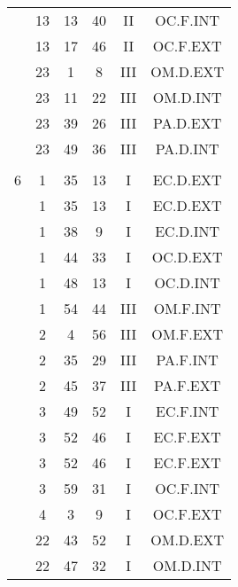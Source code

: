 \documentclass[12pt, a4paper]{article}
\begin{document}
\begin{multicols}{3}
{\begin{tabular}{c c c c c c}
	 	 	 	 & 13 & 13 & 40 & II & OC.F.INT\\%
	 	 	 	 & 13 & 17 & 46 & II & OC.F.EXT\\%
	 	 	 	 & 23 & 1 & 8 & III & OM.D.EXT\\%
	 	 	 	 & 23 & 11 & 22 & III & OM.D.INT\\%
	 	 	 	 & 23 & 39 & 26 & III & PA.D.EXT\\%
	 	 	 	 & 23 & 49 & 36 & III & PA.D.INT\\%
	 	 	 	 & & & & & \\%
	 	 	 	6 & 1 & 35 & 13 & I & EC.D.EXT\\%
	 	 	 	 & 1 & 35 & 13 & I & EC.D.EXT\\%
	 	 	 	 & 1 & 38 & 9 & I & EC.D.INT\\%
	 	 	 	 & 1 & 44 & 33 & I & OC.D.EXT\\%
	 	 	 	 & 1 & 48 & 13 & I & OC.D.INT\\%
	 	 	 	 & 1 & 54 & 44 & III & OM.F.INT\\%
	 	 	 	 & 2 & 4 & 56 & III & OM.F.EXT\\%
	 	 	 	 & 2 & 35 & 29 & III & PA.F.INT\\%
	 	 	 	 & 2 & 45 & 37 & III & PA.F.EXT\\%
	 	 	 	 & 3 & 49 & 52 & I & EC.F.INT\\%
	 	 	 	 & 3 & 52 & 46 & I & EC.F.EXT\\%
	 	 	 	 & 3 & 52 & 46 & I & EC.F.EXT\\%
	 	 	 	 & 3 & 59 & 31 & I & OC.F.INT\\%
	 	 	 	 & 4 & 3 & 9 & I & OC.F.EXT\\%
	 	 	 	 & 22 & 43 & 52 & I & OM.D.EXT\\%
	 	 	 	 & 22 & 47 & 32 & I & OM.D.INT\\%

\end{tabular}}
\end{multicols}
\end{document}
